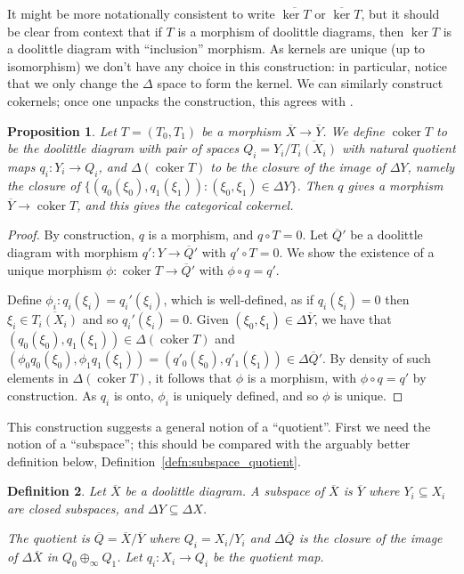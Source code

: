\documentclass[a4paper,11pt]{article}
\theoremstyle{plain}
\newtheorem{proposition}{Proposition}[section]
\newtheorem{definition}[proposition]{Definition}
\theoremstyle{remark}
\newcommand{\coker}{\operatorname{coker}}
\begin{document}
It might be more notationally consistent to write $\overline{\ker T}$ or $\overline\ker T$, but it should be clear from context that if $T$ is a morphism of doolittle diagrams, then $\ker T$ is a doolittle diagram with ``inclusion'' morphism.
As kernels are unique (up to isomorphism) we don't have any choice in this construction: in particular, notice that we only change the $\Delta$ space to form the kernel.  We can similarly construct cokernels; once one unpacks the construction, this agrees with \cite[Proposition~IV.3.2]{KP_InterpolationFunctorsDuality}.

\begin{proposition}\label{prop:cokernel_DL}
Let $T=(T_0,T_1)$ be a morphism $\overline X \to \overline Y$.  We define $\coker T$ to be the doolittle diagram with pair of spaces $Q_i = Y_i / \overline{T_i(X_i)}$ with natural quotient maps $q_i \colon Y_i \to Q_i$, and $\Delta(\coker T)$ to be the closure of the image of $\Delta Y$, namely the closure of $\{ (q_0(\xi_0), q_1(\xi_1)) : (\xi_0,\xi_1)\in\Delta Y \}$.  Then $q$ gives a morphism $\overline Y \to \coker T$, and this gives the categorical cokernel.
\end{proposition}
\begin{proof}
By construction, $q$ is a morphism, and $q \circ T = 0$.  Let $\overline Q'$ be a doolittle diagram with morphism $q' \colon Y \to \overline Q'$ with $q' \circ T = 0$.  We show the existence of a unique morphism $\phi \colon \coker T \to \overline Q'$ with $\phi\circ q = q'$.

Define $\phi_i \colon q_i(\xi_i) = q_i'(\xi_i)$, which is well-defined, as if $q_i(\xi_i)=0$ then $\xi_i\in \overline {T_i(X_i)}$ and so $q_i'(\xi_i)=0$.  Given $(\xi_0,\xi_1) \in \Delta\overline Y$, we have that $(q_0(\xi_0), q_1(\xi_1)) \in \Delta(\coker T)$ and $(\phi_0q_0(\xi_0), \phi_1q_1(\xi_1)) = (q'_0(\xi_0), q'_1(\xi_1)) \in \Delta\overline Q'$.  By density of such elements in $\Delta(\coker T)$, it follows that $\phi$ is a morphism, with $\phi\circ q = q'$ by construction.  As $q_i$ is onto, $\phi_i$ is uniquely defined, and so $\phi$ is unique.
\end{proof}

This construction suggests a general notion of a ``quotient''.  First we need the notion of a ``subspace''; this should be compared with the arguably better definition below, Definition~\ref{defn:subspace_quotient}.

\begin{definition}\label{defn:old_subspace_quotient}
Let $\overline X$ be a doolittle diagram.  A \emph{subspace} of $\overline X$ is $\overline Y$ where $Y_i\subseteq X_i$ are closed subspaces, and $\Delta Y \subseteq \Delta X$.

The \emph{quotient} is $\overline Q = \overline X / \overline Y$ where $Q_i = X_i / Y_i$ and $\Delta\overline Q$ is the closure of the image of $\Delta\overline X$ in $Q_0 \oplus_\infty Q_1$.  Let $q_i \colon X_i \to Q_i$ be the quotient map.
\end{definition}
\end{document}
